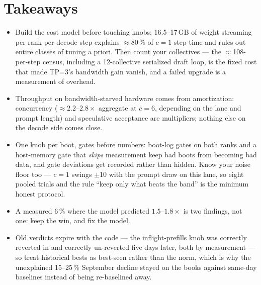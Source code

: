 \FloatBarrier
\section*{Takeaways}

\begin{itemize}
  \item Build the cost model before touching knobs: 16.5--17\,GB of weight
    streaming per rank per decode step explains $\approx$80\,\% of $c=1$ step
    time and rules out entire classes of tuning a priori. Then count your
    collectives --- the $\approx$108-per-step census, including a
    12-collective serialized draft loop, is the fixed cost that made TP=3's
    bandwidth gain vanish, and a failed upgrade is a measurement of overhead.
  \item Throughput on bandwidth-starved hardware comes from amortization:
    concurrency ($\approx$$2.2$--$2.8\times$ aggregate at $c=6$, depending on
    the lane and prompt length) and speculative acceptance are
    multipliers; nothing else on the decode side comes close.
  \item One knob per boot, gates before numbers: boot-log gates on both ranks
    and a host-memory gate that \emph{skips} measurement keep bad boots from
    becoming bad data, and gate deviations get recorded rather than hidden.
    Know your noise floor too --- $c=1$ swings $\pm$10 \tokspersec{} with the
    prompt draw on this lane, so eight pooled trials and the rule ``keep only
    what beats the band'' is the minimum honest protocol.
  \item A measured $6\,\%$ where the model predicted $1.5$--$1.8\times$ is two
    findings, not one: keep the win, and fix the model.
  \item Old verdicts expire with the code --- the inflight-prefills knob was
    correctly reverted in  and correctly un-reverted five days
    later, both by measurement --- so treat historical bests as best-seen
    rather than the norm, which is why the unexplained 15--25\,\% September
    decline stayed on the books against same-day baselines instead of being
    re-baselined away.
\end{itemize}

